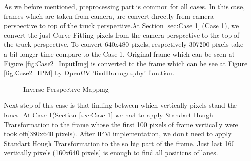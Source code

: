 As we before mentioned, preprocessing part is common for all cases. In this case, frames which are taken from camera, are convert directly from camera perspective to top of the truck perspective.At Section \ref{sec:Case 1} (Case 1), we convert the just Curve Fitting pixels from the camera perspective to the top of the truck perspective. To convert 640x480 pixels, respectively 307200 pixels take a bit longer time compare to the Case 1. Original frame which can be seen at Figure \ref{fig:Case2_InputImg} is converted to the frame which can be see at Figure \ref{fig:Case2_IPM} by OpenCV 'findHomography' function.

 
\begin{figure}[H]
  \centering
  \hfill
  \caption{Inverse Perspective Mapping}
\end{figure} 

Next step of this case is that finding between which vertically pixels stand the lanes. At Case 1(Section \ref{sec:Case 1} we had to apply Standart Hough Transformation to the frame whose the first 100 pixels of frame vertically were took off(380x640 pixels). After IPM implementation, we don't need to apply Standart Hough Transformation to the so big part of the frame. Just last 160 vertically pixels (160x640 pixels) is enough to find all positions of lanes.


